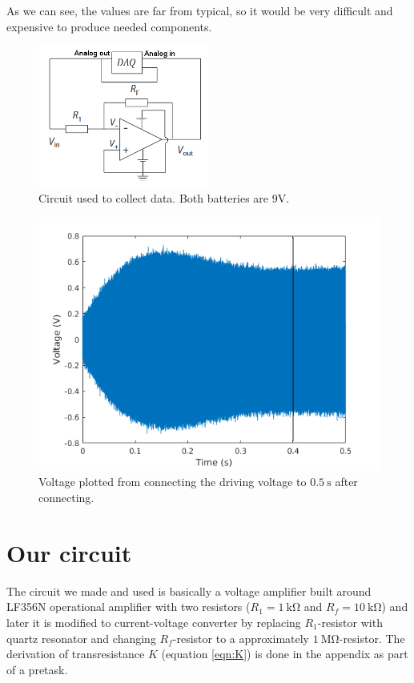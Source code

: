 \documentclass[12pt]{article}
\begin{document}
As we can see, the values are far from typical, so it would be very difficult and expensive to produce needed components.

\begin{figure}
	\centering
	\includegraphics[width = 0.5\textwidth]{kuvat/piiri}
	\caption{Circuit used to collect data. Both batteries are 9V.}
	\label{fig:circuit}
\end{figure}

\begin{figure}[!ht]
	\centering
	\includegraphics[width = \textwidth]{kuvat/steadystate.png}
	\caption{Voltage plotted from connecting the driving voltage to $\SI{0.5}{\second}$ after connecting.}
	\label{fig:steady}
\end{figure}

\section{Our circuit}

The circuit we made and used is basically a voltage amplifier built around LF356N operational amplifier with two resistors ($ R_1 = \SI{1}{\kilo\ohm}$ and $R_f = \SI{10}{\kilo\ohm}$) and later it is modified to current-voltage converter by replacing $R_1$-resistor with quartz resonator and changing $R_f$-resistor to a approximately $\SI{1}{\mega\ohm}$-resistor. The derivation of transresistance $K$ (equation \eqref{eqn:K}) is done in the appendix as part of a pretask.
\end{document}
